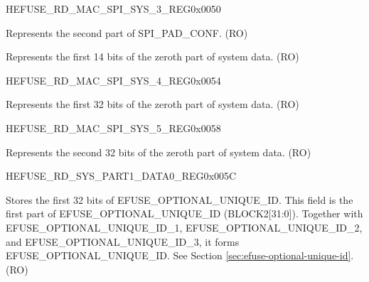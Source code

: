 \begin{register}{H}{EFUSE\_RD\_MAC\_SPI\_SYS\_3\_REG}{0x0050}\label{regdesc:EFUSERDMACSPISYS3REG}
%
%
\regnewline%
\begin{regdesc}\begin{reglist}
\label{fielddesc:EFUSESPIPADCONF2}\item [EFUSE\_SPI\_PAD\_CONF\_2] Represents the second part of SPI\_PAD\_CONF. (RO)
\label{fielddesc:EFUSESYSDATAPART00}\item [EFUSE\_SYS\_DATA\_PART0\_0] Represents the first 14 bits of the zeroth part of system data. (RO)
\end{reglist}\end{regdesc}
\end{register}


\begin{register}{H}{EFUSE\_RD\_MAC\_SPI\_SYS\_4\_REG}{0x0054}\label{regdesc:EFUSERDMACSPISYS4REG}
%
\regnewline%
\begin{regdesc}\begin{reglist}
\label{fielddesc:EFUSESYSDATAPART01}\item [EFUSE\_SYS\_DATA\_PART0\_1] Represents the first 32 bits of the zeroth part of system data. (RO)
\end{reglist}\end{regdesc}
\end{register}


\begin{register}{H}{EFUSE\_RD\_MAC\_SPI\_SYS\_5\_REG}{0x0058}\label{regdesc:EFUSERDMACSPISYS5REG}
%
\regnewline%
\begin{regdesc}\begin{reglist}
\label{fielddesc:EFUSESYSDATAPART02}\item [EFUSE\_SYS\_DATA\_PART0\_2] Represents the second 32 bits of the zeroth part of system data. (RO)
\end{reglist}\end{regdesc}
\end{register}


\begin{register}{H}{EFUSE\_RD\_SYS\_PART1\_DATA0\_REG}{0x005C}\label{regdesc:EFUSERDSYSPART1DATA0REG}
%
\regnewline%
\begin{regdesc}\begin{reglist}
\label{fielddesc:EFUSEOPTIONALUNIQUEID}\item [EFUSE\_OPTIONAL\_UNIQUE\_ID] Stores the first 32 bits of EFUSE\_OPTIONAL\_UNIQUE\_ID. This field is the first part of EFUSE\_OPTIONAL\_UNIQUE\_ID (BLOCK2[31:0]). Together with EFUSE\_OPTIONAL\_UNIQUE\_ID\_1, EFUSE\_OPTIONAL\_UNIQUE\_ID\_2, and EFUSE\_OPTIONAL\_UNIQUE\_ID\_3, it forms EFUSE\_OPTIONAL\_UNIQUE\_ID. See Section \ref{sec:efuse-optional-unique-id}. (RO)
\end{reglist}\end{regdesc}
\end{register}


